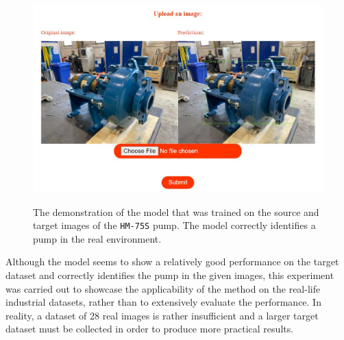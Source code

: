 \begin{figure}[htb]
	\begin{center}
		\includegraphics[width=16cm]{./pump_demo.jpg}
	\end{center}
	\caption{The demonstration of the model that was trained on the source and target images of the \texttt{HM-75S} pump. The model correctly identifies a pump in the real environment. }
	\begin{center}\label{pump_demo}
	\end{center}
\end{figure}
\FloatBarrier

Although the model seems to show a relatively good performance on the target dataset and correctly identifies the pump in the given images, this experiment was carried out to showcase the applicability of the method on the real-life industrial datasets, rather than to extensively evaluate the performance. In reality, a dataset of 28 real images is rather insufficient and a larger target dataset must be collected in order to produce more practical results. 


\clearpage

